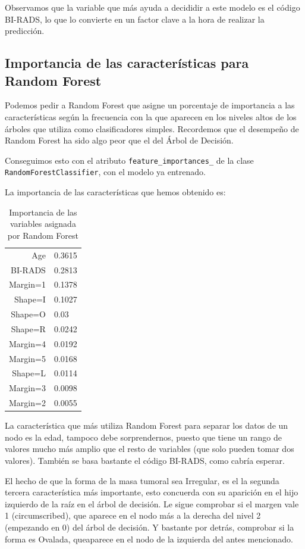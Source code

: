 \documentclass{article}
\begin{document}
Observamos que la variable que más ayuda a decididir a este modelo es
el código BI-RADS, lo que lo convierte en un factor clave a la hora de
realizar la predicción.

\subsection{Importancia de las características para Random Forest}

Podemos pedir a Random Forest que asigne un porcentaje de importancia
a las características según la frecuencia con la que aparecen en los
niveles altos de los árboles que utiliza como clasificadores simples.
Recordemos que el desempeño de Random Forest ha sido algo peor que el
del Árbol de Decisión.

Conseguimos esto con el atributo \texttt{feature\_importances\_} de la
clase \texttt{RandomForestClassifier}, con el modelo ya entrenado.

La importancia de las características que hemos obtenido es:

\begin{table}[H]
  \centering
  \begin{tabular}{r|l}
    Age & 0.3615 \\
    BI-RADS & 0.2813 \\
    Margin=1 & 0.1378 \\
    Shape=I & 0.1027 \\
    Shape=O & 0.03 \\
    Shape=R & 0.0242 \\
    Margin=4 & 0.0192 \\
    Margin=5 & 0.0168 \\
    Shape=L & 0.0114 \\
    Margin=3 & 0.0098 \\
    Margin=2 & 0.0055 \\
  \end{tabular}
  \caption{Importancia de las variables asignada por Random Forest}
  \label{tab:importance}
\end{table}

La característica que más utiliza Random Forest para separar los datos
de un nodo es la edad, tampoco debe sorprendernos, puesto que tiene un
rango de valores mucho más amplio que el resto de variables (que solo
pueden tomar dos valores). También se basa bastante el código BI-RADS,
como cabría esperar.

El hecho de que la forma de la masa tumoral sea Irregular, es el la
segunda tercera característica más importante, esto concuerda con su
aparición en el hijo izquierdo de la raíz en el árbol de decisión. Le
sigue comprobar si el margen vale 1 (circumscribed), que aparece en el
nodo más a la derecha del nivel 2 (empezando en 0) del árbol de
decisión. Y bastante por detrás, comprobar si la forma es Ovalada,
queaparece en el nodo de la izquierda del antes mencionado.
\end{document}
